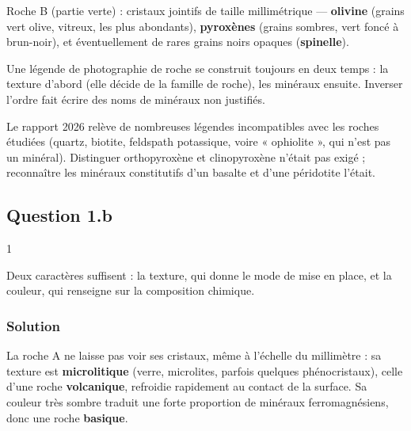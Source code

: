 \documentclass[11pt,a4paper]{article}
\begin{document}
Roche B (partie verte) : cristaux jointifs de taille millimétrique --- \textbf{olivine} (grains vert olive, vitreux, les plus abondants), \textbf{pyroxènes} (grains sombres, vert foncé à brun-noir), et éventuellement de rares grains noirs opaques (\textbf{spinelle}).

\begin{methode}

Une légende de photographie de roche se construit toujours en deux temps : la texture d'abord (elle décide de la famille de roche), les minéraux ensuite. Inverser l'ordre fait écrire des noms de minéraux non justifiés.

\end{methode}

\begin{jury}

Le rapport 2026 relève de nombreuses légendes incompatibles avec les roches étudiées (quartz, biotite, feldspath potassique, voire « ophiolite », qui n'est pas un minéral). Distinguer orthopyroxène et clinopyroxène n'était pas exigé ; reconnaître les minéraux constitutifs d'un basalte et d'une péridotite l'était.

\end{jury}

\hypertarget{question-1.b}{%
\subsection{Question 1.b}\label{question-1.b}}

\begin{indication}{1}

Deux caractères suffisent : la texture, qui donne le mode de mise en place, et la couleur, qui renseigne sur la composition chimique.

\end{indication}

\hypertarget{solution-1}{%
\subsubsection{Solution}\label{solution-1}}

La roche A ne laisse pas voir ses cristaux, même à l'échelle du millimètre : sa texture est \textbf{microlitique} (verre, microlites, parfois quelques phénocristaux), celle d'une roche \textbf{volcanique}, refroidie rapidement au contact de la surface. Sa couleur très sombre traduit une forte proportion de minéraux ferromagnésiens, donc une roche \textbf{basique}.
\end{document}
